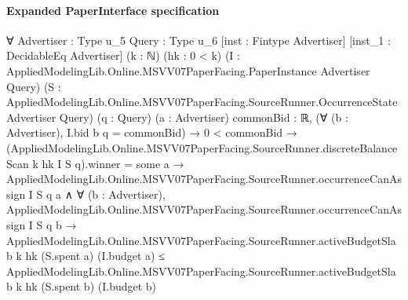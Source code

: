 \documentclass[10pt]{article}
\begin{document}
\paragraph{Expanded PaperInterface specification}
\begin{ReviewVerbatim}
∀ {Advertiser : Type u_5} {Query : Type u_6} [inst : Fintype Advertiser] [inst_1 : DecidableEq Advertiser] (k : ℕ)
  (hk : 0 < k) (I : AppliedModelingLib.Online.MSVV07PaperFacing.PaperInstance Advertiser Query)
  (S : AppliedModelingLib.Online.MSVV07PaperFacing.SourceRunner.OccurrenceState Advertiser Query) (q : Query)
  (a : Advertiser) {commonBid : ℝ},
  (∀ (b : Advertiser), I.bid b q = commonBid) →
    0 < commonBid →
      (AppliedModelingLib.Online.MSVV07PaperFacing.SourceRunner.discreteBalanceScan k hk I S q).winner = some a →
        AppliedModelingLib.Online.MSVV07PaperFacing.SourceRunner.occurrenceCanAssign I S q a ∧
          ∀ (b : Advertiser),
            AppliedModelingLib.Online.MSVV07PaperFacing.SourceRunner.occurrenceCanAssign I S q b →
              AppliedModelingLib.Online.MSVV07PaperFacing.SourceRunner.activeBudgetSlab k hk (S.spent a) (I.budget a) ≤
                AppliedModelingLib.Online.MSVV07PaperFacing.SourceRunner.activeBudgetSlab k hk (S.spent b) (I.budget b)
\end{ReviewVerbatim}
\end{document}
